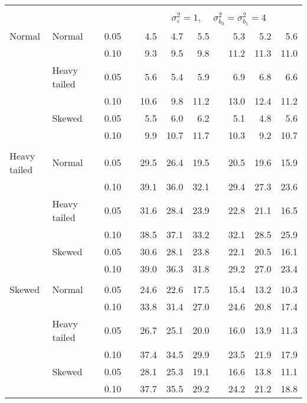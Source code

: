 \begin{table}[ht]
\begin{scriptsize}
\begin{tabular}{ll p{.1cm} c p{.1cm} rrr p{.1cm} rrr}
&&&&&&&&&&&\\
& && && \multicolumn{7}{c}{$\sigma_{\varepsilon}^2 = 1$, \ \ $\sigma_{b_0}^2 = \sigma_{b_1}^2 = 4$} \\ \cline{6-12}
\rowcolor{gray!20} Normal & Normal &  & 0.05 &  & 4.5 & 4.7 & 5.5 &  & 5.3 & 5.2 & 5.6 \\ 
\rowcolor{gray!20}    &  &  & 0.10 &  & 9.3 & 9.5 & 9.8 &  & 11.2 & 11.3 & 11.0 \\ 
\rowcolor{gray!20}    & Heavy tailed &  & 0.05 &  & 5.6 & 5.4 & 5.9 &  & 6.9 & 6.8 & 6.6 \\ 
\rowcolor{gray!20}    &  &  & 0.10 &  & 10.6 & 9.8 & 11.2 &  & 13.0 & 12.4 & 11.2 \\ 
\rowcolor{gray!20}    & Skewed &  & 0.05 &  & 5.5 & 6.0 & 6.2 &  & 5.1 & 4.8 & 5.6 \\ 
\rowcolor{gray!20}    &  &  & 0.10 &  & 9.9 & 10.7 & 11.7 &  & 10.3 & 9.2 & 10.7 \\ 
&&&&&&&&&&&\\
  Heavy tailed & Normal &  & 0.05 &  & 29.5 & 26.4 & 19.5 &  & 20.5 & 19.6 & 15.9 \\ 
   &  &  & 0.10 &  & 39.1 & 36.0 & 32.1 &  & 29.4 & 27.3 & 23.6 \\ 
   & Heavy tailed &  & 0.05 &  & 31.6 & 28.4 & 23.9 &  & 22.8 & 21.1 & 16.5 \\ 
   &  &  & 0.10 &  & 38.5 & 37.1 & 33.2 &  & 32.1 & 28.5 & 25.9 \\ 
   & Skewed &  & 0.05 &  & 30.6 & 28.1 & 23.8 &  & 22.1 & 20.5 & 16.1 \\ 
   &  &  & 0.10 &  & 39.0 & 36.3 & 31.8 &  & 29.2 & 27.0 & 23.4 \\ 
&&&&&&&&&&&\\
  Skewed & Normal &  & 0.05 &  & 24.6 & 22.6 & 17.5 &  & 15.4 & 13.2 & 10.3 \\ 
   &  &  & 0.10 &  & 33.8 & 31.4 & 27.0 &  & 24.6 & 20.8 & 17.4 \\ 
   & Heavy tailed &  & 0.05 &  & 26.7 & 25.1 & 20.0 &  & 16.0 & 13.9 & 11.3 \\ 
   &  &  & 0.10 &  & 37.4 & 34.5 & 29.9 &  & 23.5 & 21.9 & 17.9 \\ 
   & Skewed &  & 0.05 &  & 28.1 & 25.3 & 19.1 &  & 16.6 & 13.8 & 11.1 \\ 
   &  &  & 0.10 &  & 37.7 & 35.5 & 29.2 &  & 24.2 & 21.2 & 18.8 \\ 


\hline
\end{tabular}
\end{scriptsize}
\end{table}




